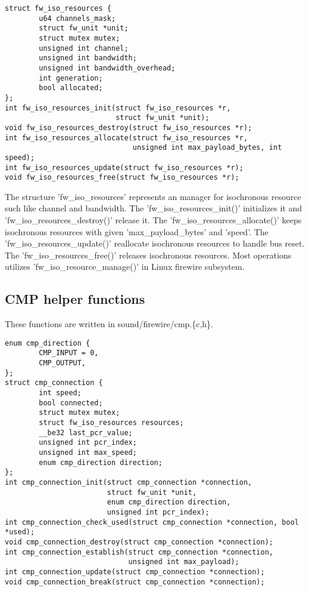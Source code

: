\documentclass[onecolumn]{article}
\begin{document}
\begin{verbatim}
struct fw_iso_resources {
        u64 channels_mask;
        struct fw_unit *unit;
        struct mutex mutex;
        unsigned int channel;
        unsigned int bandwidth;
        unsigned int bandwidth_overhead;
        int generation;
        bool allocated;
};
int fw_iso_resources_init(struct fw_iso_resources *r,
                          struct fw_unit *unit);
void fw_iso_resources_destroy(struct fw_iso_resources *r);
int fw_iso_resources_allocate(struct fw_iso_resources *r,
                              unsigned int max_payload_bytes, int speed);
int fw_iso_resources_update(struct fw_iso_resources *r);
void fw_iso_resources_free(struct fw_iso_resources *r);
\end{verbatim}

The structure 'fw\_iso\_resources' represents an manager for isochronous resource such like channel and bandwidth. The 'fw\_iso\_resources\_init()' initializes it and 'fw\_iso\_resources\_destroy()' release it.
The 'fw\_iso\_resources\_allocate()' keeps isochronous resources with given 'max\_payload\_bytes' and 'speed'. The 'fw\_iso\_resources\_update()' reallocate isochronous resources to handle bus reset. The 'fw\_iso\_resources\_free()' releases isochronous resources. Most operations utilizes 'fw\_iso\_resource\_manage()' in Linux firewire subsystem.

\subsection{CMP helper functions}

These functions are written in sound/firewire/cmp.\{c,h\}.

\begin{verbatim}
enum cmp_direction {
        CMP_INPUT = 0,
        CMP_OUTPUT,
};
struct cmp_connection {
        int speed;
        bool connected;
        struct mutex mutex;
        struct fw_iso_resources resources;
        __be32 last_pcr_value;
        unsigned int pcr_index;
        unsigned int max_speed;
        enum cmp_direction direction;
};
int cmp_connection_init(struct cmp_connection *connection,
                        struct fw_unit *unit,
                        enum cmp_direction direction,
                        unsigned int pcr_index);
int cmp_connection_check_used(struct cmp_connection *connection, bool *used);
void cmp_connection_destroy(struct cmp_connection *connection);
int cmp_connection_establish(struct cmp_connection *connection,
                             unsigned int max_payload);
int cmp_connection_update(struct cmp_connection *connection);
void cmp_connection_break(struct cmp_connection *connection);
\end{verbatim}
\end{document}
